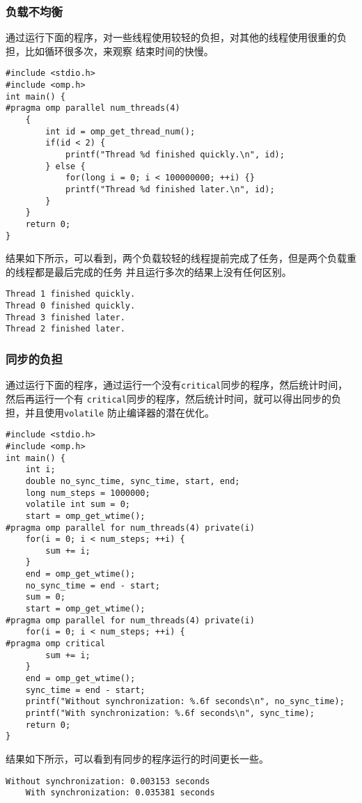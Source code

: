 \documentclass{article}
\begin{document}
\subsubsection{负载不均衡}
通过运行下面的程序，对一些线程使用较轻的负担，对其他的线程使用很重的负担，比如循环很多次，来观察
结束时间的快慢。
\begin{lstlisting}[style=cstyle,caption={负载不均衡}]
#include <stdio.h>
#include <omp.h>
int main() {
#pragma omp parallel num_threads(4)
    {
        int id = omp_get_thread_num();
        if(id < 2) {
            printf("Thread %d finished quickly.\n", id);
        } else {
            for(long i = 0; i < 100000000; ++i) {}
            printf("Thread %d finished later.\n", id);
        }
    }
    return 0;
}
\end{lstlisting}
结果如下所示，可以看到，两个负载较轻的线程提前完成了任务，但是两个负载重的线程都是最后完成的任务
并且运行多次的结果上没有任何区别。
\begin{lstlisting}[style=bashstyle,caption={负载不均衡}]
Thread 1 finished quickly.
Thread 0 finished quickly.
Thread 3 finished later.
Thread 2 finished later.
\end{lstlisting}
\subsubsection{同步的负担}
通过运行下面的程序，通过运行一个没有\texttt{critical}同步的程序，然后统计时间，然后再运行一个有
\texttt{critical}同步的程序，然后统计时间，就可以得出同步的负担，并且使用\texttt{volatile}
防止编译器的潜在优化。
\begin{lstlisting}[style=cstyle,caption={同步的负担}]
#include <stdio.h>
#include <omp.h>
int main() {
    int i;
    double no_sync_time, sync_time, start, end;
    long num_steps = 1000000;
    volatile int sum = 0;
    start = omp_get_wtime();
#pragma omp parallel for num_threads(4) private(i)
    for(i = 0; i < num_steps; ++i) {
        sum += i;
    }
    end = omp_get_wtime();
    no_sync_time = end - start;
    sum = 0;
    start = omp_get_wtime();
#pragma omp parallel for num_threads(4) private(i)
    for(i = 0; i < num_steps; ++i) {
#pragma omp critical
        sum += i;
    }
    end = omp_get_wtime();
    sync_time = end - start;
    printf("Without synchronization: %.6f seconds\n", no_sync_time);
    printf("With synchronization: %.6f seconds\n", sync_time);
    return 0;
}
\end{lstlisting}
结果如下所示，可以看到有同步的程序运行的时间更长一些。
\begin{lstlisting}[style=bashstyle,caption={同步的负担}]
    Without synchronization: 0.003153 seconds
    With synchronization: 0.035381 seconds
\end{lstlisting}
\end{document}
